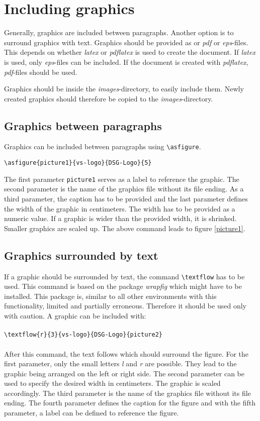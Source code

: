 %
\section{Including graphics}
%
Generally, graphics are included between paragraphs.
Another option is to surround graphics with text.
Graphics should be provided as or \emph{pdf} or \emph{eps}-files.
This depends on whether \emph{latex} or \emph{pdflatex} is used to create the document.
If \emph{latex} is used, only \emph{eps}-files can be included.
If the document is created with \emph{pdflatex}, \emph{pdf}-files should be used.

Graphics should be inside the \emph{images}-directory, to easily include them. 
Newly created graphics should therefore be copied to the \emph{images}-directory.

\subsection{Graphics between paragraphs}
%
Graphics can be included between paragraphs using 
\texttt{\textbackslash asfigure}.
\begin{verbatim}
\asfigure{picture1}{vs-logo}{DSG-Logo}{5}
\end{verbatim}
The first parameter \texttt{picture1} serves as a label to reference the graphic. 
The second parameter is the name of the graphics file without its file ending.
As a third parameter, the caption has to be provided and the last parameter defines the width of the graphic in centimeters. 
The width has to be provided as a numeric value. 
If a graphic is wider than the provided width, it is shrinked.
Smaller graphics are scaled up.
The above command leads to figure \ref{picture1}.


\subsection{Graphics surrounded by text}
%
If a graphic should be surrounded by text, the command \texttt{\textbackslash textflow} has to be used.
This command is based on the package \emph{wrapfig} which might have to be installed.
This package is, similar to all other environments with this functionality, limited and partially erroneous.
Therefore it should be used only with caution.
A graphic can be included with:\\\\
\verb+\textflow{r}{3}{vs-logo}{DSG-Logo}{picture2}+\\\\
After this command, the text follows which should surround the figure.
For the first parameter, only the small letters \emph{l} and \emph{r} are possible.
They lead to the graphic being arranged on the left or right side.
The second parameter can be used to specify the desired width in centimeters.
The graphic is scaled accordingly.
The third parameter is the name of the graphics file without its file ending.
The fourth parameter defines the caption for the figure and with the fifth parameter, a label can be defined to reference the figure.

